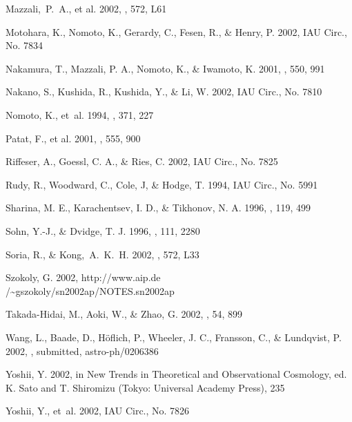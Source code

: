 \documentclass[10pt,preprint2]{aastex}
\begin{document}
\begin{references}
Mazzali,~P.~A., et al. 2002, \apj, 572, L61

Motohara, K., Nomoto, K., Gerardy, C., Fesen, R., \&
Henry, P. 2002, IAU Circ., No. 7834

Nakamura, T., Mazzali, P. A., Nomoto, K., \& Iwamoto, K.
    2001, \apj, 550, 991

Nakano, S., Kushida, R., Kushida, Y., \& Li, W. 2002,
IAU Circ., No. 7810

Nomoto, K., et~al. 1994, \nat, 371, 227

Patat, F., et al. 2001, \apj, 555, 900

Riffeser, A., Goessl, C. A., \& Ries, C.  2002, IAU
Circ.,
    No. 7825

Rudy, R., Woodward, C., Cole, J, \& Hodge, T. 1994,
IAU Circ., No. 5991

Sharina, M. E., Karachentsev, I. D., \& Tikhonov, N. A.
    1996, \aaps, 119, 499

Sohn, Y.-J., \& Dvidge, T. J. 1996, \aj, 111, 2280

Soria, R., \& Kong,~A.~K.~H. 2002, \apj, 572, L33

Szokoly, G. 2002,
    http://www.aip.de\\ /\~{}gszokoly/sn2002ap/NOTES.sn2002ap

Takada-Hidai, M., Aoki, W., \& Zhao, G. 2002, \pasj,
54, 899

Wang, L., Baade, D., H\"oflich, P., Wheeler, J. C.,
Fransson, C., \& Lundqvist, P. 2002, \apj, submitted,
astro-ph/0206386

Yoshii, Y. 2002, in New Trends in Theoretical and
    Observational Cosmology, ed. K. Sato and T. Shiromizu
    (Tokyo: Universal Academy Press), 235

Yoshii, Y., et~al. 2002, IAU Circ., No. 7826

\end{references}


\clearpage

\end{document}

